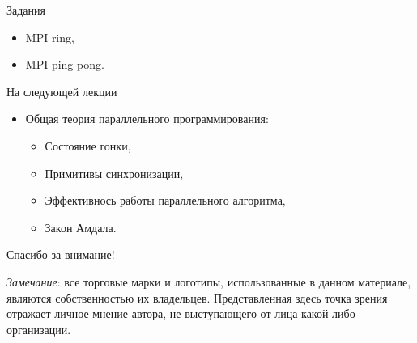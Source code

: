 \begin{frame}{Задания}
\begin{itemize}
    \item MPI ring,
    \item MPI ping-pong.
\end{itemize}
\end{frame}

\begin{frame}{На следующей лекции}
\begin{itemize}
    \item Общая теория параллельного программирования:
    \begin{itemize}
        \item Состояние гонки,
        \item Примитивы синхронизации,
        \item Эффективнось работы параллельного алгоритма,
        \item Закон Амдала.
    \end{itemize}
\end{itemize}
\end{frame}

\begin{frame}

{\huge{Спасибо за внимание!}\par}

\vfill

\tiny{\textit{Замечание}: все торговые марки и логотипы, использованные в данном материале, являются собственностью их владельцев. Представленная здесь точка зрения отражает личное мнение автора, не выступающего от лица какой-либо организации.}

\end{frame}



